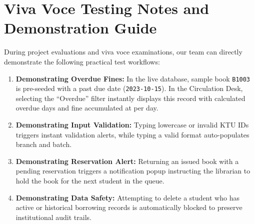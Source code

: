 \section{Viva Voce Testing Notes and Demonstration Guide}
During project evaluations and viva voce examinations, our team can directly demonstrate the following practical test workflows:
\begin{enumerate}
    \item \textbf{Demonstrating Overdue Fines:} In the live database, sample book \texttt{B1003} is pre-seeded with a past due date (\texttt{2023-10-15}). In the Circulation Desk, selecting the ``Overdue'' filter instantly displays this record with calculated overdue days and fine accumulated at  per day.
    \item \textbf{Demonstrating Input Validation:} Typing lowercase or invalid KTU IDs triggers instant validation alerts, while typing a valid format auto-populates branch and batch.
    \item \textbf{Demonstrating Reservation Alert:} Returning an issued book with a pending reservation triggers a notification popup instructing the librarian to hold the book for the next student in the queue.
    \item \textbf{Demonstrating Data Safety:} Attempting to delete a student who has active or historical borrowing records is automatically blocked to preserve institutional audit trails.
\end{enumerate}
